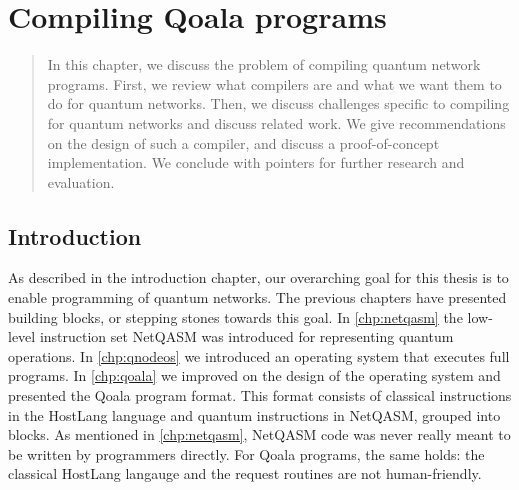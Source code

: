 \chapter
 [Compiling Qoala programs]
 {Compiling Qoala programs}
\label{chp:compiler}


\begin{abstract}
In this chapter, we discuss the problem of compiling quantum network programs.
First, we review what compilers are and what we want them to do for quantum networks.
Then, we discuss challenges specific to compiling for quantum networks and discuss related work.
We give recommendations on the design of such a compiler, and discuss a proof-of-concept implementation.
We conclude with pointers for further research and evaluation.


\end{abstract}

\section{Introduction}
As described in the introduction chapter, our overarching goal for this thesis is to enable programming of quantum networks.
The previous chapters have presented building blocks, or stepping stones towards this goal.
In \cref{chp:netqasm} the low-level instruction set NetQASM was introduced for representing quantum operations.
In \cref{chp:qnodeos} we introduced an operating system that executes full programs.
In \cref{chp:qoala} we improved on the design of the operating system and presented the Qoala program format.
This format consists of classical instructions in the HostLang language and quantum instructions in NetQASM, grouped into blocks.
As mentioned in \cref{chp:netqasm}, NetQASM code was never really meant to be written by programmers directly.
For Qoala programs, the same holds: the classical HostLang langauge and the request routines are not human-friendly.

